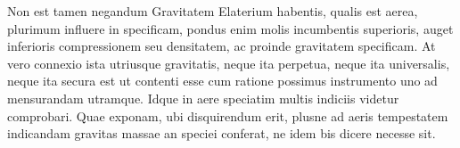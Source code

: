 
\pstart  Non est tamen negandum Gravitatem\protect{}  Elaterium\protect{} habentis, qualis est aerea, plurimum  influere in specificam, pondus\protect{} enim molis incumbentis superioris,  auget inferioris compressionem seu densitatem,  ac proinde gravitatem specificam\protect{}. At vero  connexio ista utriusque gravitatis\protect{}, neque ita perpetua,  neque ita universalis, neque ita secura est ut contenti  esse cum ratione possimus instrumento uno ad  mensurandam utramque. Idque in aere  speciatim multis indiciis videtur comprobari.  Quae  exponam, ubi disquirendum erit,  plusne ad aeris tempestatem indicandam gravitas\protect{} massae\protect{} an speciei conferat, ne  idem bis dicere necesse sit.
\pend

